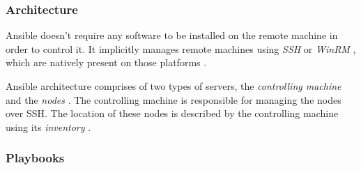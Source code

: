 \documentclass[9pt,twocolumn,twoside]{../../styles/osajnl}
\begin{document}
\subsubsection{Architecture}
Ansible doesn't require any software to be installed on the remote
machine in order to control it. It implicitly manages remote machines
using \emph{SSH} \cite{www-ssh} or \emph{WinRM}
\cite{www-winrm-microsoft}, which are natively present on those
platforms \cite{www-ansible-architecture}.

\noindent
Ansible architecture comprises of two types of servers, the
\emph{controlling machine} and the \emph{nodes}
\cite{www-wiki-ansible}. The controlling machine is responsible for
managing the nodes over SSH. The location of these nodes is described
by the controlling machine using its \emph{inventory}
\cite{www-ansible-inventory}.


\subsubsection{Playbooks}
\end{document}

